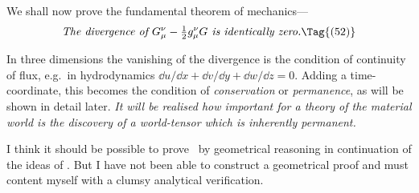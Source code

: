 \documentclass[12pt]{book}
\begin{document}
%

We shall now prove the fundamental theorem of me\-cha\-nics---
%
\[
\text{\emph{The divergence of $G_{\mu}^{\nu} - \tfrac{1}{2}g_{\mu}^{\nu} G$ is identically zero.}}
\index{Divergence!energy@of energy-tensor}%
\Tag{(52)}
\]

In three dimensions the vanishing of the divergence is the condition of
continuity of flux, e.g.\ in hydrodynamics $\dd u/\dd x + \dd v/\dd y + \dd w/\dd z = 0$. Adding a
time-coordinate, this becomes the condition of \emph{conservation} or \emph{permanence}, as
%
will be shown in detail later. \emph{It will be realised how important for a theory
of the material world is the discovery of a world-tensor which is inherently
permanent.}

I think it should be possible to prove~ by geometrical reasoning in
continuation of the ideas of . But I have not been able to construct a
geometrical proof and must content myself with a clumsy analytical verification.
\end{document}
